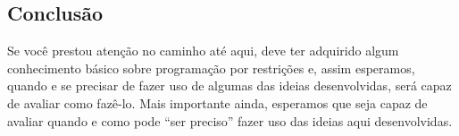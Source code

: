\documentclass{article}
\begin{document}
\subsection{Conclusão}



Se você prestou atenção no caminho até aqui, deve ter adquirido algum
conhecimento básico sobre programação por restrições e, assim
esperamos, quando e se precisar de fazer uso de algumas das ideias
desenvolvidas, será capaz de avaliar como fazê-lo. Mais importante
ainda, esperamos que seja capaz de avaliar quando e como pode ``ser
preciso'' fazer uso das ideias aqui desenvolvidas.
\end{document}
